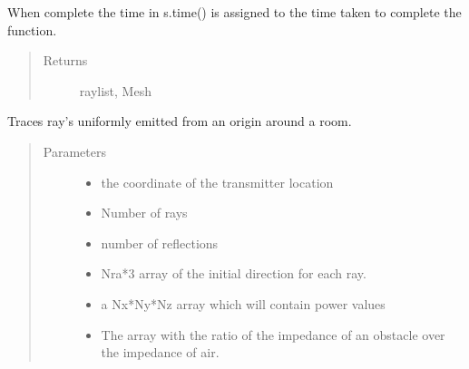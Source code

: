 \documentclass[letterpaper,10pt,english]{sphinxmanual}
\begin{document}
\begin{fulllineitems}
\begin{fulllineitems}
When complete the time in s.time() is assigned to the time taken     to complete the function.
\begin{quote}\begin{description}
\item[{Returns}] \leavevmode
raylist, Mesh

\end{description}\end{quote}

\end{fulllineitems}


\begin{fulllineitems}
\label{\detokenize{index:Room.room.ray_mesh_power_bounce}}
Traces ray’s uniformly emitted from an origin around a room.
\begin{quote}\begin{description}
\item[{Parameters}] \leavevmode\begin{itemize}
\item {} 
 \textendash{} the co\sphinxhyphen{}ordinate of the transmitter location

\item {} 
 \textendash{} Number of rays

\item {} 
 \textendash{} number of reflections

\item {} 
 \textendash{} Nra*3 array of the initial direction for     each ray.

\item {} 
 \textendash{} a Nx*Ny*Nz array which will contain power values

\item {} 
 \textendash{} The array with the ratio of the impedance of an     obstacle over the impedance of air.


\end{itemize}
\end{description}
\end{quote}
\end{fulllineitems}
\end{fulllineitems}
\end{document}
